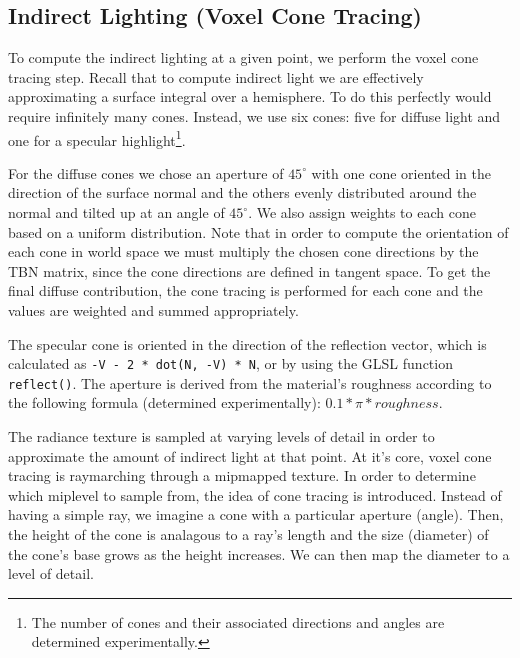 \subsection{Indirect Lighting (Voxel Cone Tracing)}
To compute the indirect lighting at a given point, we perform the voxel cone tracing step. Recall that to compute indirect light we are effectively approximating a surface integral over a hemisphere. To do this perfectly would require infinitely many cones. Instead, we use six cones: five for diffuse light and one for a specular highlight\footnote{The number of cones and their associated directions and angles are determined experimentally.}.

For the diffuse cones we chose an aperture of $45^\circ$ with one cone oriented in the direction of the surface normal and the others evenly distributed around the normal and tilted up at an angle of $45^\circ$. We also assign weights to each cone based on a uniform distribution. Note that in order to compute the orientation of each cone in world space we must multiply the chosen cone directions by the TBN matrix, since the cone directions are defined in tangent space. To get the final diffuse contribution, the cone tracing is performed for each cone and the values are weighted and summed appropriately.

The specular cone is oriented in the direction of the reflection vector, which is calculated as \texttt{-V - 2 * dot(N, -V) * N}, or by using the GLSL function \texttt{reflect()}. The aperture is derived from the material's roughness according to the following formula (determined experimentally): $0.1 * \pi * roughness$.


The radiance texture is sampled at varying levels of detail in order to approximate the amount of indirect light at that point. At it's core, voxel cone tracing is raymarching through a mipmapped texture. In order to determine which miplevel to sample from, the idea of cone tracing is introduced. Instead of having a simple ray, we imagine a cone with a particular aperture (angle). Then, the height of the cone is analagous to a ray's length and the size (diameter) of the cone's base grows as the height increases. We can then map the diameter to a level of detail.


